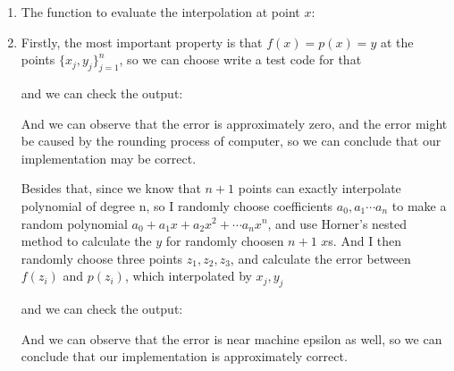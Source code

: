 \documentclass{article}
\begin{document}
\begin{enumerate}
\begin{enumerate}
 
 
 \item
 The function to evaluate the interpolation at point $x$:
 
 
 \item
 Firstly, the most important property is that $f(x) = p(x) = y$ at the points $\{x_j,y_j\}_{j=1}^n$, so we can choose write a test code for that 
  
  and we can check the output:
  
  And we can observe that the error is approximately zero, and the error might be caused by the rounding process of computer, so we can conclude that our implementation may be correct.
  
  Besides that, since we know that $n+1$ points can exactly interpolate polynomial of degree n, so I randomly choose coefficients $a_0, a_1 \cdots a_n$ to make a random polynomial $a_0+a_1x+a_2x^2+\cdots a_nx^n$, and use Horner's nested method to  calculate the $y$ for randomly choosen $n+1$ $x$s. And I then randomly choose three points $z_1,z_2,z_3$, and calculate the error between $f(z_i)$ and $p(z_i)$, which interpolated by ${x_j,y_j}$ 
    
  and we can check the output:
  
  And we can observe that the error is near machine epsilon as well, so we can conclude that our implementation is approximately correct.
  

\end{enumerate}
\end{enumerate}
\end{document}
